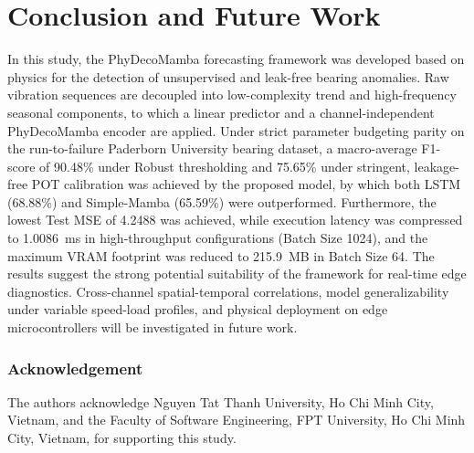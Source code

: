 \documentclass[runningheads]{llncs}
\begin{document}
\section{Conclusion and Future Work} \label{sect:s6}
In this study, the PhyDecoMamba forecasting framework was developed based on physics for the detection of unsupervised and leak-free bearing anomalies. Raw vibration sequences are decoupled into low-complexity trend and high-frequency seasonal components, to which a linear predictor and a channel-independent PhyDecoMamba encoder are applied. Under strict parameter budgeting parity on the run-to-failure Paderborn University bearing dataset, a macro-average F1-score of 90.48\% under Robust thresholding and 75.65\% under stringent, leakage-free POT calibration was achieved by the proposed model, by which both LSTM (68.88\%) and Simple-Mamba (65.59\%) were outperformed. Furthermore, the lowest Test MSE of 4.2488 was achieved, while execution latency was compressed to 1.0086~ms in high-throughput configurations (Batch Size 1024), and the maximum VRAM footprint was reduced to 215.9~MB in Batch Size 64. The results suggest the strong potential suitability of the framework for real-time edge diagnostics. Cross-channel spatial-temporal correlations, model generalizability under variable speed-load profiles, and physical deployment on edge microcontrollers will be investigated in future work.

\subsubsection*{Acknowledgement}
The authors acknowledge Nguyen Tat Thanh University, Ho Chi Minh City, Vietnam, and the Faculty of Software Engineering, FPT University, Ho Chi Minh City, Vietnam, for supporting this study. 
\end{document}
